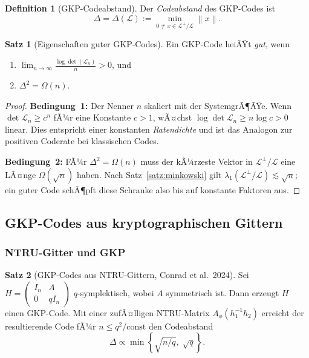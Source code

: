 ﻿\documentclass[a4paper,12pt]{article}
\theoremstyle{definition}
\newtheorem{definition}{Definition}
\newtheorem{satz}{Satz}
\newcommand{\Lat}{\mathcal{L}}
\newcommand{\norm}[1]{\left\|#1\right\|}
\begin{document}
\begin{definition}[GKP-Codeabstand]
Der \emph{Codeabstand} des GKP-Codes ist
\[
    \Delta = \Delta(\Lat) := \min_{0 \neq x \in \Lat^\perp / \Lat} \norm{x}.
\]
\end{definition}

\begin{satz}[Eigenschaften guter GKP-Codes]
\label{satz:good_gkp}
Ein GKP-Code heiÃŸt \emph{gut}, wenn
\begin{enumerate}
    \item $\lim_{n \to \infty} \frac{\log \det(\mathcal{L}_n)}{n} > 0$, und
    \item $\Delta^2 = \Omega(n)$.
\end{enumerate}
\end{satz}

\begin{proof}
\textbf{Bedingung~1:} Der Nenner $n$ skaliert mit der SystemgrÃ¶ÃŸe.
Wenn $\det \Lat_n \geq c^n$ fÃ¼r eine Konstante $c > 1$, wÃ¤chst
$\log \det \Lat_n \geq n \log c > 0$ linear.
Dies entspricht einer konstanten \emph{Ratendichte} und ist das Analogon zur positiven
Coderate bei klassischen Codes.

\textbf{Bedingung~2:}
FÃ¼r $\Delta^2 = \Omega(n)$ muss der kÃ¼rzeste Vektor in $\Lat^\perp / \Lat$
eine LÃ¤nge $\Omega(\sqrt{n})$ haben.
Nach Satz~\ref{satz:minkowski} gilt $\lambda_1(\Lat^\perp / \Lat) \lesssim \sqrt{n}$;
ein guter Code schÃ¶pft diese Schranke also bis auf konstante Faktoren aus.
\end{proof}

\subsection{GKP-Codes aus kryptographischen Gittern}

\subsubsection{NTRU-Gitter und GKP}

\begin{satz}[GKP-Codes aus NTRU-Gittern, Conrad et al.~2024]
\label{satz:ntru_gkp}
Sei $H = \begin{pmatrix} I_n & A \\ 0 & qI_n \end{pmatrix}$ $q$-symplektisch, wobei $A$
symmetrisch ist. Dann erzeugt $H$ einen GKP-Code.
Mit einer zufÃ¤lligen NTRU-Matrix $A_\phi(h_1^{-1}h_2)$ erreicht der resultierende Code
fÃ¼r $n \leq q^2/\mathrm{const}$ den Codeabstand
\[
    \Delta \propto \min\!\left\{ \sqrt{n/q},\; \sqrt{q} \right\}.
\]
\end{satz}
\end{document}
